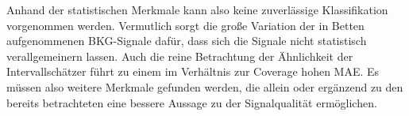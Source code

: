 Anhand der statistischen Merkmale kann also keine zuverlässige Klassifikation vorgenommen werden. Vermutlich sorgt die große Variation der in Betten aufgenommenen \ac{BKG}-Signale dafür, dass sich die Signale nicht statistisch verallgemeinern lassen. Auch die reine Betrachtung der Ähnlichkeit der Intervallschätzer führt zu einem im Verhältnis zur Coverage hohen \ac{MAE}. Es müssen also weitere Merkmale gefunden werden, die allein oder ergänzend zu den bereits betrachteten eine bessere Aussage zu der Signalqualität ermöglichen.